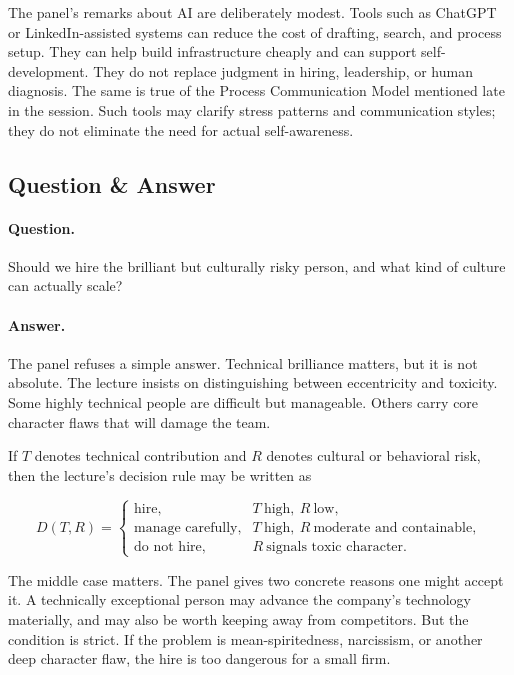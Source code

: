 The panel's remarks about AI are deliberately modest. Tools such as ChatGPT or LinkedIn-assisted systems can reduce the cost of drafting, search, and process setup. They can help build infrastructure cheaply and can support self-development. They do not replace judgment in hiring, leadership, or human diagnosis. The same is true of the Process Communication Model mentioned late in the session. Such tools may clarify stress patterns and communication styles; they do not eliminate the need for actual self-awareness.

\subsection{Question \& Answer}

\paragraph{Question.} Should we hire the brilliant but culturally risky person, and what kind of culture can actually scale?

\paragraph{Answer.} The panel refuses a simple answer. Technical brilliance matters, but it is not absolute. The lecture insists on distinguishing between eccentricity and toxicity. Some highly technical people are difficult but manageable. Others carry core character flaws that will damage the team.

If \(T\) denotes technical contribution and \(R\) denotes cultural or behavioral risk, then the lecture's decision rule may be written as

\begin{equation}
D(T,R)=
\begin{cases}
\text{hire}, & T\ \text{high},\ R\ \text{low},\\
\text{manage carefully}, & T\ \text{high},\ R\ \text{moderate and containable},\\
\text{do not hire}, & R\ \text{signals toxic character}.
\end{cases}
\end{equation}

The middle case matters. The panel gives two concrete reasons one might accept it. A technically exceptional person may advance the company's technology materially, and may also be worth keeping away from competitors. But the condition is strict. If the problem is mean-spiritedness, narcissism, or another deep character flaw, the hire is too dangerous for a small firm.

